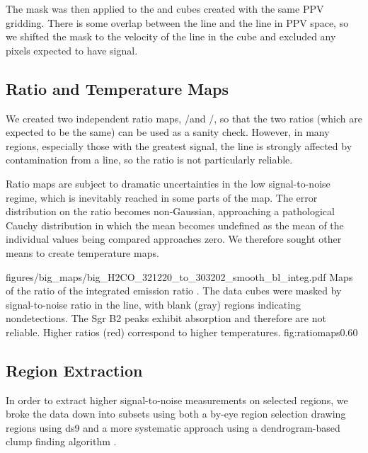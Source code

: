 The \formaldehyde \threeohthree mask was then applied to the \threetwoone and
\threetwotwo cubes created with the same PPV gridding.  There is some overlap
between the \methanol \fourtwotwo line and the \formaldehyde \threetwotwo
line in PPV space, so we shifted the \formaldehyde mask to the velocity of the
\methanol line in the \formaldehyde \threetwotwo cube and excluded any pixels
expected to have signal.

\subsection{Ratio and Temperature Maps}
\label{sec:h2co}
We created two independent ratio maps, \threeohthree/\threetwotwo and
\threeohthree/\threetwoone, so that the two ratios (which are expected to be
the same) can be used as a sanity check.  However, in many regions, especially
those with the greatest signal, the \threetwotwo line is strongly affected by
contamination from a \methanol line, so the ratio is not particularly reliable.

Ratio maps are subject to dramatic uncertainties in the low signal-to-noise
regime, which is inevitably reached in some parts of the map.  The error
distribution on the ratio becomes non-Gaussian, approaching a pathological
Cauchy distribution in which the mean becomes undefined as the mean of the
individual values being compared approaches zero.  We therefore sought other
means to create temperature maps.


\Figure
{figures/big_maps/big_H2CO_321220_to_303202_smooth_bl_integ.pdf}
{Maps of the ratio of the integrated emission ratio
\Rone.  The data cubes were masked by
signal-to-noise ratio in the \threeohthree line, with blank (gray) regions
indicating nondetections.  The Sgr B2 peaks exhibit \formaldehyde
absorption and therefore are not reliable.  Higher ratios (red) correspond
to higher temperatures.
}
{fig:ratiomaps}{0.6}{0}

\subsection{Region Extraction}
In order to extract higher signal-to-noise measurements on selected regions, we
broke the data down into subsets using both a by-eye region selection drawing
regions using ds9 and a more systematic approach using a dendrogram-based clump
finding algorithm \citep[][\url{http://dendrograms.org/}]{Rosolowsky2008c}.

